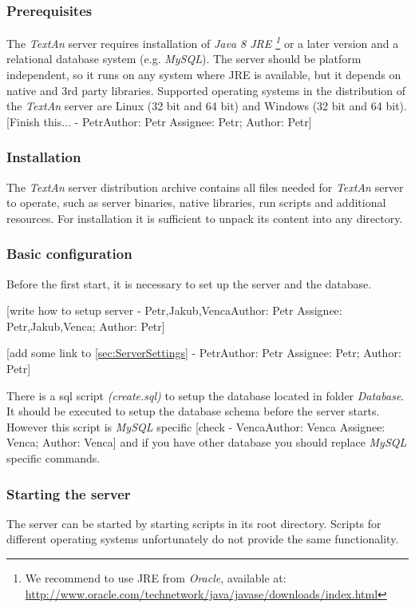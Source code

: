 \documentclass[12pt,a4paper]{report}
\makeatletter
\newcommand{\comment}[3][\@empty]{
  {\color{magenta}[#3 - }
  {\color{green}\ifx\@empty#1\relax Author: #2 \else Assignee: #1; Author: #2\fi}{\color{magenta}]}
}
\newcommand{\textan}{\emph{TextAn}}
\makeatother
\begin{document}
\subsubsection{Prerequisites}
\label{sssec:SerInstPre}

The \textan{} server requires installation of \emph{Java 8 JRE
\footnote{We recommend to use JRE from \emph{Oracle}, available at: \url{http://www.oracle.com/technetwork/java/javase/downloads/index.html}}}
or a later version and a relational database system (e.g. \emph{MySQL}).
The server should be platform independent, so it runs on any system where JRE is available,
but it depends on native and 3rd party libraries. 
Supported operating systems in the distribution of the \textan{} server are
Linux (32 bit and 64 bit) and Windows (32 bit and 64 bit). \comment[Petr]{Petr}{Finish this...}

\subsubsection{Installation}

The \textan{} server distribution archive contains all files needed for \textan{} server to operate,
such as server binaries, native libraries, run scripts and additional resources.
For installation it is sufficient to unpack its content into any directory.

\subsubsection{Basic configuration}

Before the first start, it is necessary to set up the server and the database.

\comment[Petr,Jakub,Venca]{Petr}{write how to setup server}

\comment[Petr]{Petr}{add some link to \ref{sec:ServerSettings}}

There is a sql script \emph{(create.sql)} to setup the database located in folder  \emph{Database}. It should be executed to setup the database schema before the server starts. However this script is \emph{MySQL} specific \comment[Venca]{Venca}{check} and if you have other database you should replace \emph{MySQL} specific commands.

\subsubsection{Starting the server}

The server can be started by starting scripts in its root directory. 
Scripts for different operating systems unfortunately do not provide the same functionality.
\end{document}
